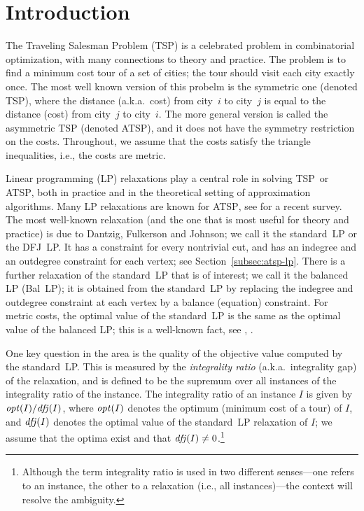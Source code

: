 \documentclass[11pt]{article}
\newcommand{\tsp}{\textsc{TSP}}
\newcommand{\atsp}{\textsc{ATSP}}
\newcommand{\opt}{\textit{opt\/}}
\newcommand{\dfj}{\textit{dfj\/}}
\begin{document}
\section{Introduction}\label{sec:intro}


The Traveling Salesman Problem (\tsp) is a celebrated problem in
combinatorial optimization, with many connections to theory and
practice.  The problem is to find a minimum cost tour of a set of
cities; the tour should visit each city exactly once. The most well
known version of this probelm is the symmetric one (denoted \tsp),
where the distance (a.k.a.~cost) from city~$i$ to city~$j$ is equal to
the distance (cost) from city~$j$ to city~$i$. The more general version
is called the asymmetric TSP (denoted \atsp), and it does not have the symmetry
restriction on the costs. Throughout, we assume that the costs satisfy
the triangle inequalities, i.e., the costs are metric.

Linear programming (LP) relaxations play a central role in solving  \tsp\ 
or \atsp, both in
practice and in the theoretical setting of approximation algorithms.
Many LP relaxations are known for \atsp, see \cite{RT12} for a recent
survey. The most well-known relaxation (and the one that is most useful
for theory and practice) is due to Dantzig, Fulkerson and Johnson; we
call it the standard~LP or the DFJ~LP. It has a constraint for every
nontrivial cut, and has an indegree and an outdegree constraint for
each vertex; see Section~\ref{subsec:atsp-lp}.
There is a further relaxation of the standard~LP that is of interest; we
call it the balanced LP (Bal~LP); it is obtained from the standard~LP
by replacing the indegree and outdegree constraint at each vertex by a
balance (equation) constraint. For metric costs, the optimal value of
the standard~LP is the same as the optimal value of the balanced LP;
this is a well-known fact, see \cite{RT12}, \cite[Footnote~3]{CGK06}.

One key question in the area is the quality of the objective value
computed by the standard~LP.  This is measured by the \textit{integrality
ratio} (a.k.a.~integrality gap) of the relaxation, and is defined to be
the supremum over all instances of the integrality ratio of the
instance.  The integrality ratio of an instance $I$ is given by
$\opt(I)/\dfj(I)$, where $\opt(I)$ denotes the optimum (minimum cost of
a tour) of $I$, and $\dfj(I)$ denotes the optimal value of the standard~LP
relaxation of $I$; we assume that the optima exist and that
$\dfj(I)\not=0$.\footnote{
Although the term integrality ratio is used in two different
senses---one refers to an instance, the other to a relaxation
(i.e., all instances)---the context will resolve the ambiguity.}
\end{document}
